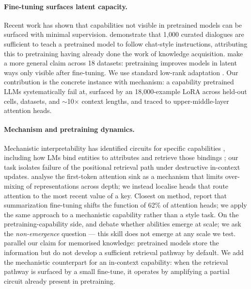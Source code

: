 \documentclass[letterpaper]{article} %
\begin{document}
\paragraph{Fine-tuning surfaces latent capacity.}
Recent work has shown that capabilities not visible in pretrained
models can be surfaced with minimal supervision.
\citet{zhou2023lima} demonstrate that 1{,}000 curated dialogues are
sufficient to teach a pretrained model to follow chat-style
instructions, attributing this to pretraining having already done
the work of knowledge acquisition.
\citet{amuro2024finetuning} make a more general claim across 18
datasets: pretraining improves models in latent ways only visible
after fine-tuning.
We use standard low-rank adaptation \citep{hu2021lora,
aghajanyan2021intrinsic}.
Our contribution is the concrete instance with mechanism: a
capability pretrained LLMs systematically fail at, surfaced by an
18{,}000-example LoRA across held-out cells, datasets, and
$\sim$10$\times$ context lengths, and traced to upper-middle-layer
attention heads.

\paragraph{Mechanism and pretraining dynamics.}
Mechanistic interpretability has identified circuits for specific
capabilities \citep{olsson2022induction, wang2022ioi, conmy2023acdc,
li2025state}, including how LMs bind entities to attributes and
retrieve those bindings \citep{feng2024binding, gurarieh2025mixing};
our task isolates failure of the positional retrieval path under
destructive in-context updates.
\citet{barbero2025firsttoken} analyse the first-token attention sink
as a mechanism that limits over-mixing of representations across
depth; we instead localise heads that route attention to the most
recent value of a key. Closest on method, \citet{mishra2025summarization} report that
summarization fine-tuning shifts the function of 62\% of attention
heads; we apply the same approach to a mechanistic capability
rather than a style task.
On the pretraining-capability side, \citet{wei2022emergent} and
\citet{schaeffer2023mirage} debate whether abilities emerge at
scale; we ask the \emph{non-emergence} question --- this skill
does not emerge at any scale we test. \citet{allenzhu2024knowledge}
parallel our claim for memorised knowledge: pretrained models store
the information but do not develop a sufficient retrieval pathway
by default. We add the mechanistic counterpart for an
in-context capability: when the retrieval pathway is surfaced by a
small fine-tune, it operates by amplifying a partial circuit
already present in pretraining.
\end{document}

